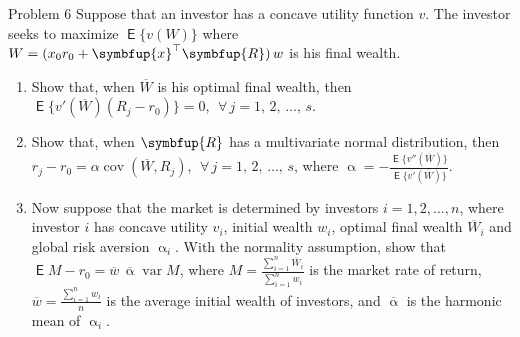 \documentclass[10pt,handout]{beamer}
\newcommand{\ds}{\displaystyle}
\newcommand{\vx}{\symbfup{x}}
\newcommand{\vR}{\symbfup{R}}
\DeclareMathOperator\expc{\mathsf{E}}
\DeclareMathOperator\var{var}
\DeclareMathOperator\cov{cov}
\theoremstyle{definition}
\begin{document}
\begin{frame}[allowframebreaks]
\begin{enumerate}
  \end{enumerate}
\end{frame}

\begin{frame}{Problem 6}
  Suppose that an investor has a concave utility function $v$. The investor seeks to maximize $\expc\big\{v(W)\big\}$ where $\ds W = (x_0 r_0 + \vx^\top\vR)\,w$ is his final wealth.
  \begin{enumerate}
    \item Show that, when $\overline{W}$ is his optimal final wealth, then $\ds\expc\big\{v'(\overline{W})(R_j - r_0)\big\} = 0$, $\;\forall\,j = 1,\,2,\,\ldots,\,s$.
    \item Show that, when $\vR$ has a multivariate normal distribution, then $\ds r_j - r_0 = \alpha\cov(\overline{W}, R_j)$, $\;\forall\,j = 1,\,2,\,\ldots,\,s$, where $\ds\upalpha = -\frac{\expc\big\{v''(\overline{W})\big\}}{\expc\big\{v'(\overline{W})\big\}}$. %
    \item Now suppose that the market is determined by investors $i = 1, 2, \ldots, n$, where investor $i$ has concave utility $v_i$, initial wealth $w_i$, optimal final wealth $\overline{W}_i$ and global risk aversion $\upalpha_i$. With the normality assumption, show that $\ds\expc M - r_0 = \overline{w}\,\overline{\upalpha}\var M$, where $\ds M = \frac{\sum_{i=1}^n\overline{W}_{\!\!i}}{\sum_{i=1}^n w_i}$ is the market rate of return, $\ds\overline{w} = \frac{\sum_{i=1}^n w_i}{n}$ is the average initial wealth of investors, and $\overline{\upalpha}$ is the harmonic mean of $\upalpha_i$.
  \end{enumerate}
\end{frame}
\end{document}
